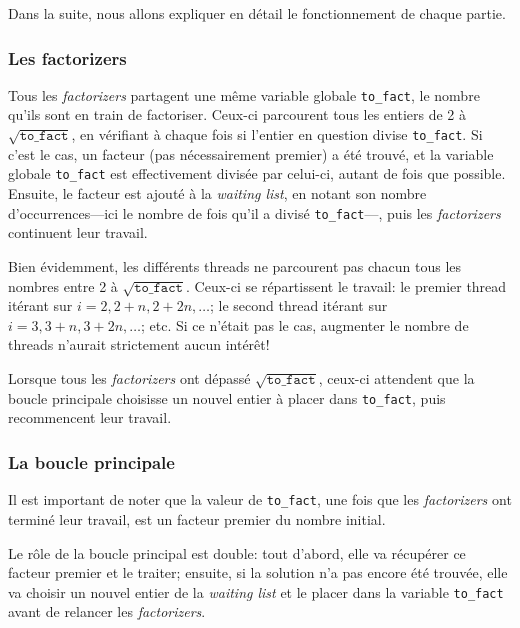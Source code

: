 \documentclass[a4paper,10pt]{article}
\begin{document}
Dans la suite, nous allons expliquer en détail le fonctionnement de chaque partie.

\subsubsection*{Les factorizers}

Tous les \emph{factorizers} partagent une même variable globale \texttt{to\_fact}, le nombre qu'ils sont en train de factoriser. Ceux-ci parcourent tous les entiers de 2 à $\sqrt{\texttt{to\_fact}}$, en vérifiant à chaque fois si l'entier en question divise \texttt{to\_fact}. Si c'est le cas, un facteur (pas nécessairement premier) a été trouvé, et la variable globale \texttt{to\_fact} est effectivement divisée par celui-ci, autant de fois que possible. Ensuite, le facteur est ajouté à la \emph{waiting list}, en notant son nombre d'occurrences---ici le nombre de fois qu'il a divisé \texttt{to\_fact}---, puis les \emph{factorizers} continuent leur travail.

Bien évidemment, les différents threads ne parcourent pas chacun tous les nombres entre 2 à $\sqrt{\texttt{to\_fact}}$. Ceux-ci se répartissent le travail: le premier thread itérant sur $i=2,2+n,2+2n,\dots$; le second thread itérant sur $i=3,3+n,3+2n,\dots$; etc. Si ce n'était pas le cas, augmenter le nombre de threads n'aurait strictement aucun intérêt!

Lorsque tous les \emph{factorizers} ont dépassé $\sqrt{\texttt{to\_fact}}$, ceux-ci attendent que la boucle principale choisisse un nouvel entier à placer dans \texttt{to\_fact}, puis recommencent leur travail.

\subsubsection*{La boucle principale}

Il est important de noter que la valeur de \texttt{to\_fact}, une fois que les \emph{factorizers} ont terminé leur travail, est un facteur premier du nombre initial. %

Le rôle de la boucle principal est double: tout d'abord, elle va récupérer ce facteur premier et le traiter; ensuite, si la solution n'a pas encore été trouvée, elle va choisir un nouvel entier de la \emph{waiting list} et le placer dans la variable \texttt{to\_fact} avant de relancer les \emph{factorizers}.
\end{document}
